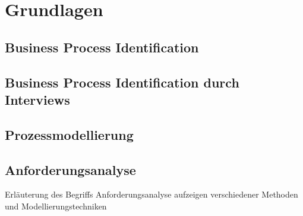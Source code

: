 \section{Grundlagen}\label{sec:grundlagen}

\subsection{Business Process Identification}


\subsection{Business Process Identification durch Interviews}\label{subsec:interviews-grundlagen}


\subsection{Prozessmodellierung}\label{subsec:prozessmodellierung}


\subsection{Anforderungsanalyse}\label{subsec:anforderungsanalyse-grundlagen}
Erläuterung des Begriffs Anforderungsanalyse aufzeigen verschiedener Methoden und Modellierungstechniken
